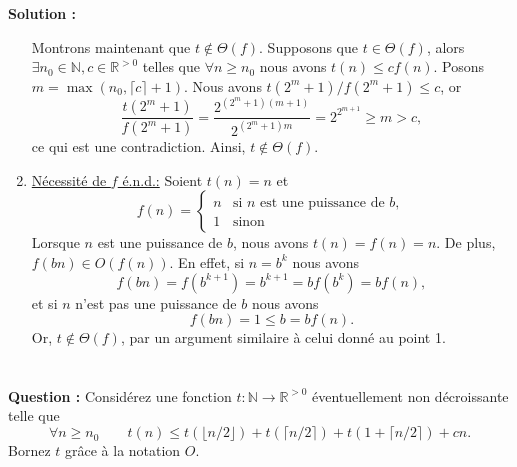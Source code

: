 \documentclass[11pt]{article} %
\newenvironment{question}[1][\unskip]{%
	\par
	\noindent
	\textbf{Question #1:}
	\noindent}
{\medskip}
\newenvironment{solution}[1][\unskip]{%
	\par
	\noindent
	\textbf{Solution #1:}
	\noindent}
{\medskip}
\begin{document}
\begin{solution}
\begin{enumerate}
{				Montrons maintenant que $t\notin \Theta(f)$. Supposons que $t\in \Theta(f)$, alors $\exists n_0\in \mathbb{N}, c \in \mathbb{R}^{>0}$ telles que $\forall n\geq n_0$ nous avons $t(n)\leq cf(n)$. Posons $m=\max(n_0, \lceil c \rceil+1)$. Nous avons $t(2^m +1)/f(2^m + 1)\leq c$, or
				$$\frac{t(2^{m}+1)}{f(2^m+1)}=\frac{2^{(2^m+1)(m+1) }}{2^{(2^m+1) m}}=2^{2^{m+1}}\geq m > c,$$
				ce qui est une contradiction. Ainsi, $t\notin \Theta(f).$
			}
			\item{\underline{Nécessité de $f$ é.n.d.:} Soient $t(n)=n$ et
				\begin{equation*}
					f(n)=\left\{
					\begin{array}{ll}
						n & \text{si } n \text{ est une puissance de }b,\\
						1 & \text{sinon }
					\end{array} \right.
				\end{equation*}	
				Lorsque $n$ est une puissance de $b$, nous avons $t(n)=f(n)=n$. De plus, $f(bn) \in O(f(n))$. En effet, si  $n=b^k$ nous avons
				$$f(bn)=f(b^{k+1})=b^{k+1}=bf(b^k)=bf(n),$$
				et si $n$ n'est pas une puissance de $b$ nous avons
				$$f(bn)=1\leq b= bf(n).$$
				Or, $t \notin \Theta(f)$, par un argument similaire à celui donné au point 1.
			}
		\end{enumerate}
	\end{solution}
	

\section{}
	\begin{question}
		Considérez une fonction $t : \mathbb{N}\rightarrow \mathbb{R}^{>0}$ éventuellement non décroissante telle que
		$$\forall n \geq n_0 \qquad t(n) \leq t(\lfloor n/2\rfloor) + t(\lceil n/2\rceil) + t(1 + \lceil n/2\rceil) + cn.$$
		Bornez $t$ grâce à la notation $O$.
	\end{question}
\end{document}
